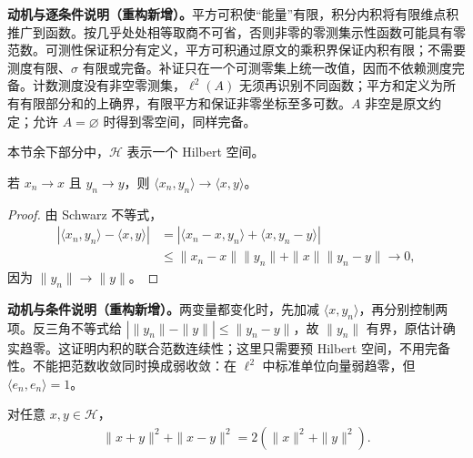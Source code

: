 \documentclass[../../main.tex]{subfiles}
\begin{document}
\begin{remark}
\textbf{动机与逐条件说明（重构新增）。}平方可积使“能量”有限，积分内积将有限维点积推广到函数。按几乎处处相等取商不可省，否则非零的零测集示性函数可能具有零范数。可测性保证积分有定义，平方可积通过原文的乘积界保证内积有限；不需要测度有限、$\sigma$ 有限或完备。补证只在一个可测零集上统一改值，因而不依赖测度完备。计数测度没有非空零测集，$\ell^2(A)$ 无须再识别不同函数；平方和定义为所有有限部分和的上确界，有限平方和保证非零坐标至多可数。$A$ 非空是原文约定；允许 $A=\varnothing$ 时得到零空间，同样完备。
\end{remark}
本节余下部分中，$\mathscr H$ 表示一个 Hilbert 空间。
\begin{proposition}\label{proposition:ch05-inner-product-continuity}
若 $x_n\to x$ 且 $y_n\to y$，则 $\langle x_n,y_n\rangle\to\langle x,y\rangle$。
\end{proposition}
\begin{proof}
由 Schwarz 不等式，
\begin{align*}
|\langle x_n,y_n\rangle-\langle x,y\rangle|
&=|\langle x_n-x,y_n\rangle+\langle x,y_n-y\rangle|\\
&\leqslant\|x_n-x\|\|y_n\|+\|x\|\|y_n-y\|\longrightarrow0,
\end{align*}
因为 $\|y_n\|\to\|y\|$。
\end{proof}
\begin{remark}
\textbf{动机与条件说明（重构新增）。}两变量都变化时，先加减 $\langle x,y_n\rangle$，再分别控制两项。反三角不等式给 $|\|y_n\|-\|y\||\leqslant\|y_n-y\|$，故 $\|y_n\|$ 有界，原估计确实趋零。这证明内积的联合范数连续性；这里只需要预 Hilbert 空间，不用完备性。不能把范数收敛同时换成弱收敛：在 $\ell^2$ 中标准单位向量弱趋零，但 $\langle e_n,e_n\rangle=1$。
\end{remark}
\begin{theorem}[平行四边形恒等式]\label{theorem:ch05-parallelogram}
对任意 $x,y\in\mathscr H$，
\begin{align*}
\|x+y\|^2+\|x-y\|^2=2(\|x\|^2+\|y\|^2).
\end{align*}
\end{theorem}
\end{document}
